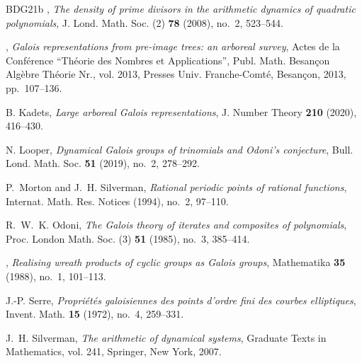 \documentclass[11pt]{amsart}
\theoremstyle{definition}
\theoremstyle{definition}
\numberwithin{thm}{section}
\numberwithin{equation}{thm}
\begin{document}
\begin{thebibliography}{BDG{\etalchar{+}}21b}
\bysame, \emph{The density of prime divisors in the arithmetic dynamics of
  quadratic polynomials}, J. Lond. Math. Soc. (2) \textbf{78} (2008), no.~2,
  523--544.

\bysame, \emph{Galois representations from pre-image trees: an arboreal
  survey}, Actes de la {C}onf\'erence ``{T}h\'eorie des {N}ombres et
  {A}pplications'', Publ. Math. Besan\c con Alg\`ebre Th\'eorie Nr., vol. 2013,
  Presses Univ. Franche-Comt\'e, Besan\c con, 2013, pp.~107--136.

B. Kadets, \emph{Large arboreal {G}alois representations}, J. Number Theory
  \textbf{210} (2020), 416--430.

N. Looper, \emph{Dynamical {G}alois groups of trinomials and {O}doni's
  conjecture}, Bull. Lond. Math. Soc. \textbf{51} (2019), no.~2, 278--292.

P.~Morton and J.~H. Silverman, \emph{Rational periodic points of rational
  functions}, Internat. Math. Res. Notices (1994), no.~2, 97--110.

R.~W.~K. Odoni, \emph{The {G}alois theory of iterates and composites of
  polynomials}, Proc. London Math. Soc. (3) \textbf{51} (1985), no.~3,
  385--414.

\bysame, \emph{Realising wreath products of cyclic groups as {G}alois groups},
  Mathematika \textbf{35} (1988), no.~1, 101--113.

J.-P. Serre, \emph{Propri\'et\'es galoisiennes des points d'ordre fini des
  courbes elliptiques}, Invent. Math. \textbf{15} (1972), no.~4, 259--331.

J.~H. Silverman, \emph{The arithmetic of dynamical systems}, Graduate Texts in
  Mathematics, vol. 241, Springer, New York, 2007.

\end{thebibliography}
\end{document}
